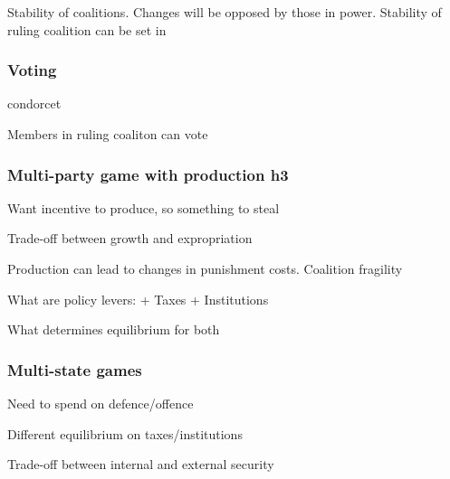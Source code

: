 Stability of coalitions. Changes will be opposed by those in power. Stability of ruling coalition can be set in
\subsubsection{Voting}
condorcet

Members in ruling coaliton can vote
\subsubsection{Multi-party game with production h3}
Want incentive to produce, so something to steal

Trade-off between growth  and expropriation

Production can lead to changes in punishment costs. Coalition fragility

What are policy levers:
+ Taxes
+ Institutions

What determines equilibrium for both
\subsubsection{Multi-state games}
Need to spend on defence/offence

Different equilibrium on taxes/institutions

Trade-off between internal and external security

